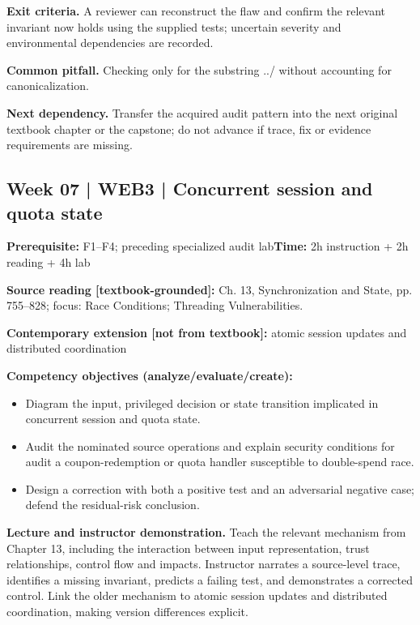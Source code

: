\documentclass[10pt,letterpaper]{article}
\begin{document}
\textbf{Exit criteria.} A reviewer can reconstruct the flaw and confirm the relevant invariant now holds using the supplied tests; uncertain severity and environmental dependencies are recorded.

\textbf{Common pitfall.} Checking only for the substring ../ without accounting for canonicalization.

\textbf{Next dependency.} Transfer the acquired audit pattern into the next original textbook chapter or the capstone; do not advance if trace, fix or evidence requirements are missing.

\subsection{Week 07 | WEB3 | Concurrent session and quota state}
\textbf{Prerequisite:} F1--F4; preceding specialized audit lab\hfill\textbf{Time:} 2h instruction + 2h reading + 4h lab

\textbf{Source reading [textbook-grounded]:} Ch. 13, Synchronization and State, pp. 755--828; focus: Race Conditions; Threading Vulnerabilities.

\textbf{Contemporary extension [not from textbook]:} atomic session updates and distributed coordination

\textbf{Competency objectives (analyze/evaluate/create):}
\begin{itemize}[leftmargin=*,itemsep=2pt]
\item Diagram the input, privileged decision or state transition implicated in concurrent session and quota state.
\item Audit the nominated source operations and explain security conditions for audit a coupon-redemption or quota handler susceptible to double-spend race.
\item Design a correction with both a positive test and an adversarial negative case; defend the residual-risk conclusion.
\end{itemize}
\textbf{Lecture and instructor demonstration.} Teach the relevant mechanism from Chapter 13, including the interaction between input representation, trust relationships, control flow and impacts. Instructor narrates a source-level trace, identifies a missing invariant, predicts a failing test, and demonstrates a corrected control. Link the older mechanism to atomic session updates and distributed coordination, making version differences explicit.
\end{document}
